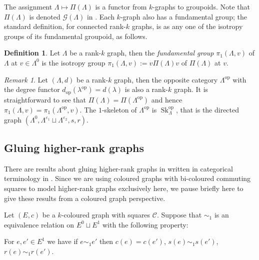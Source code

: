 \documentclass[12pt]{amsart}
\theoremstyle{definition}
\newtheorem{dfn}[thm]{Definition}
\theoremstyle{remark}
\newtheorem{rmk}[thm]{Remark}
\numberwithin{equation}{section}
\newcommand{\Gg}{\mathcal{G}}
\newcommand{\Cc}{\mathcal{C}}
\newcommand{\Sk}{\operatorname{Sk}}
\begin{document}
\noindent
The assignment $\Lambda \mapsto \Pi (\Lambda)$ is a functor from $k$-graphs to groupoids. Note that $\Pi(\Lambda)$ is denoted $\Gg (\Lambda)$ in \cite{PQR1}. Each $k$-graph also has a fundamental group; the standard definition, for connected rank-$k$ graphs, is as any one of the isotropy groups of its fundamental groupoid, as follows.

\begin{dfn}
Let $\Lambda$ be a rank-$k$ graph, then the \emph{fundamental group} $\pi_1(\Lambda, v)$ of $\Lambda$ at $v \in\Lambda^0$ is the isotropy group $\pi_1 (\Lambda, v) := v \Pi ( \Lambda ) v$ of $\Pi(\Lambda)$ at $v$.
\end{dfn}
\begin{rmk} \label{rmk:opposite0}
Let $(\Lambda,d)$ be a rank-$k$ graph, then the opposite category $\Lambda^{\mathrm{op}}$ with the degree functor $d_{\mathrm{op}} ( \lambda^{\mathrm{op}} ) = d(\lambda)$ is also a rank-$k$ graph. It is straightforward to see that $\Pi ( \Lambda ) = \Pi ( \Lambda^{\mathrm{op}} )$ and hence $\pi_1 (\Lambda, v) = \pi_1 ( \Lambda^{\mathrm{op}},v)$. The $1$-skeleton of $\Lambda^{\mathrm{op}}$ is $\Sk_\Lambda^{\mathrm{op}}$, that is the directed graph $( \Lambda^0 , \Lambda^{\varepsilon_1} \sqcup \Lambda^{\varepsilon_2} , s , r)$.
\end{rmk}

\subsection{Gluing higher-rank graphs} \label{sec:glue-coloured}


\noindent
There are results about gluing higher-rank graphs in   written in categorical terminology in \cite[\S 2]{KPSW}. Since we are using coloured graphs with bi-coloured commuting squares to model higher-rank graphs exclusively here, we pause briefly here to give these results from a coloured graph perspective. 

Let $(E,c)$ be a $k$-coloured graph with squares $\Cc$.  
Suppose that $\sim_1$ is an equivalence relation on $E^0 \sqcup E^1$
with the following property: 
\begin{center}
For $e,e' \in E^1$ we have if $e \sim_1 e'$ then $c(e) = c(e')$, $s(e) \sim_1 s(e')$, $r(e) \sim_1 r(e')$. 
\end{center}
\end{document}
